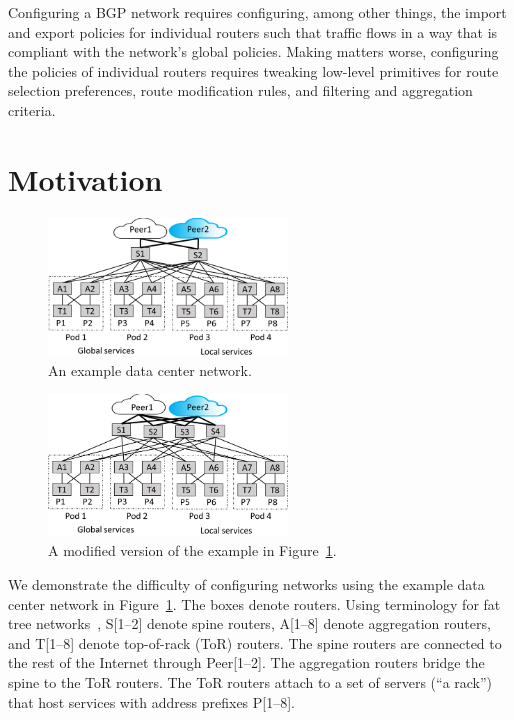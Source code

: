 \documentclass[numbers, 10pt, preprint]{sigplanconf}
\begin{document}
Configuring a BGP network requires configuring, among other things, the import and export policies for individual routers such that traffic flows in a way that is compliant with the network's global policies. Making matters worse, configuring the policies of individual routers requires tweaking low-level primitives for route selection preferences, route modification rules, and filtering and aggregation criteria.

\section{Motivation}
\label{sec:motivation}


\begin{figure}[t!]
  \centering
  \includegraphics[width=2.5in]{figures/example}
  \caption{An example data center network.}
  \label{fig:example}
  \vspace{-1em}
\end{figure}

\begin{figure}[t!]
  \centering
  \includegraphics[width=2.5in]{figures/example2}
  \caption{A modified version of the example in Figure~\ref{fig:example}.}
  \label{fig:example2}
  \vspace{-1em}
\end{figure}

We demonstrate the difficulty of configuring networks using the example data center network in Figure~\ref{fig:example}. The boxes denote routers. Using terminology for fat tree networks~\cite{fattree}, S[1--2] denote spine routers, A[1--8] denote aggregation routers, and T[1--8] denote top-of-rack (ToR) routers. The spine routers are connected to the
rest of the Internet through Peer[1--2]. The aggregation routers
bridge the spine to the ToR routers. The ToR routers attach to a set of servers (``a rack'') that host services with address prefixes P[1--8].
\end{document}
